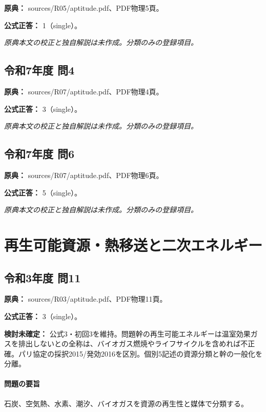 \noindent\textbf{原典：} sources/R05/aptitude.pdf、PDF物理5頁。

\textbf{公式正答：} 1（single）。

\par\textit{原典本文の校正と独自解説は未作成。分類のみの登録項目。}

\subsection{令和7年度 問4}
\label{q:r07-reg-apt-04}

\noindent\textbf{原典：} sources/R07/aptitude.pdf、PDF物理4頁。

\textbf{公式正答：} 3（single）。

\par\textit{原典本文の校正と独自解説は未作成。分類のみの登録項目。}

\subsection{令和7年度 問6}
\label{q:r07-reg-apt-06}

\noindent\textbf{原典：} sources/R07/aptitude.pdf、PDF物理6頁。

\textbf{公式正答：} 5（single）。

\par\textit{原典本文の校正と独自解説は未作成。分類のみの登録項目。}

\section{再生可能資源・熱移送と二次エネルギー}

\subsection{令和3年度 問11}
\label{q:r03-reg-apt-11}

\noindent\textbf{原典：} sources/R03/aptitude.pdf、PDF物理11頁。

\textbf{公式正答：} 3（single）。

\par\textbf{検討未確定：} 公式3・初回3を維持。問題幹の再生可能エネルギーは温室効果ガスを排出しないとの全称は、バイオガス燃焼やライフサイクルを含めれば不正確。パリ協定の採択2015/発効2016を区別。個別5記述の資源分類と幹の一般化を分離。

\paragraph{問題の要旨} 石炭、空気熱、水素、潮汐、バイオガスを資源の再生性と媒体で分類する。

